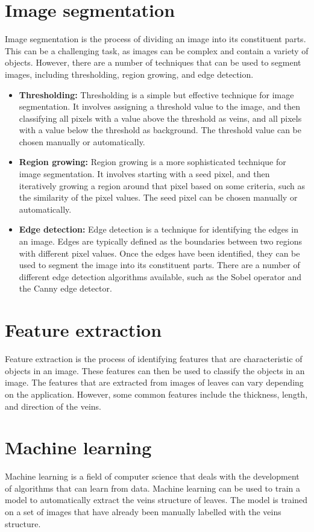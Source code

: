 \documentclass{report}
\begin{document}
{\section{Image segmentation}
Image segmentation is the process of dividing an image into its
constituent parts. This can be a challenging task, as images can be complex and contain a variety of objects. However, there are a number of techniques that can be used to segment images, including thresholding, region growing, and edge detection.
\begin{itemize}
    \item \textbf{Thresholding:} Thresholding is a simple but effective technique for image segmentation. It involves assigning a threshold value to the image, and then classifying all pixels with a value above the threshold as veins, and all pixels with a value below the threshold as background. The threshold value can be chosen manually or automatically.
     \item \textbf{Region growing:} Region growing is a more sophisticated technique for image segmentation. It involves starting with a seed pixel, and then iteratively growing a region around that pixel based on some criteria, such as the similarity of the pixel values. The seed pixel can be chosen manually or automatically.
    \item \textbf{Edge detection:} Edge detection is a technique for identifying the edges in an image. Edges are typically defined as the boundaries between two regions with different pixel values. Once the edges have been identified, they can be used to segment the image into its constituent parts. There are a number of different edge detection algorithms available, such as the Sobel operator and the Canny edge detector.
\end{itemize}
\section{Feature extraction}
Feature extraction is the process of identifying features that are
characteristic of objects in an image. These features can then be used to classify the objects in an image. The features that are extracted from images of leaves can vary depending on the application. However, some common features include the thickness, length, and direction of the veins.
\section{Machine learning}
Machine learning is a field of computer science that deals with the development of algorithms that can learn from data. Machine learning can be used to train a model to automatically extract the veins structure of leaves. The model is trained on a set of images that have already been manually labelled with the veins structure.

}
\end{document}
